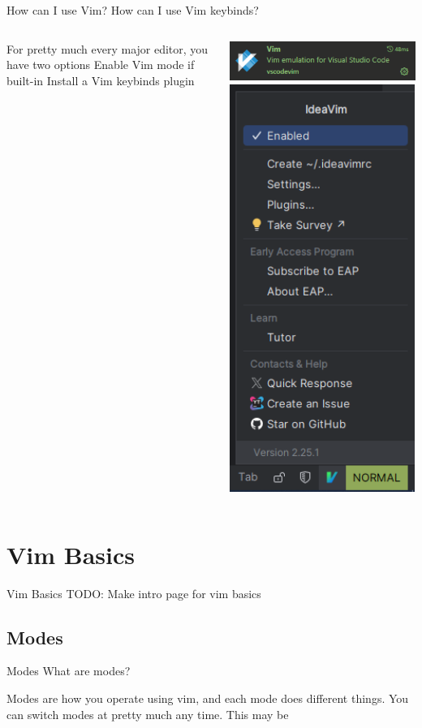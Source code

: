 \documentclass[12pt]{beamer}
\begin{document}
\begin{frame}{How can I use Vim?}
{\large How can I use Vim keybinds?}

\begin{columns}
     \begin{outline}
        \1 For pretty much every major editor, you have two options
        \2 Enable Vim mode if built-in
        \2 Install a Vim keybinds plugin
    \end{outline}
     \includegraphics[width=\linewidth]{images/VimPlugin.PNG} \includegraphics[width=\linewidth]{images/IdeaVim.PNG}
\end{columns}
    
\end{frame}

\section{Vim Basics}
\begin{frame}{Vim Basics}
TODO: Make intro page for vim basics
\end{frame}
\subsection{Modes}

\begin{frame}{Modes}
    {\large What are modes?}
    \begin{outline}
        \1 Modes are how you operate using vim, and each mode does different things. You can switch modes at pretty much any time.
        \2 This may be
\end{outline}
\end{frame}
\end{document}
